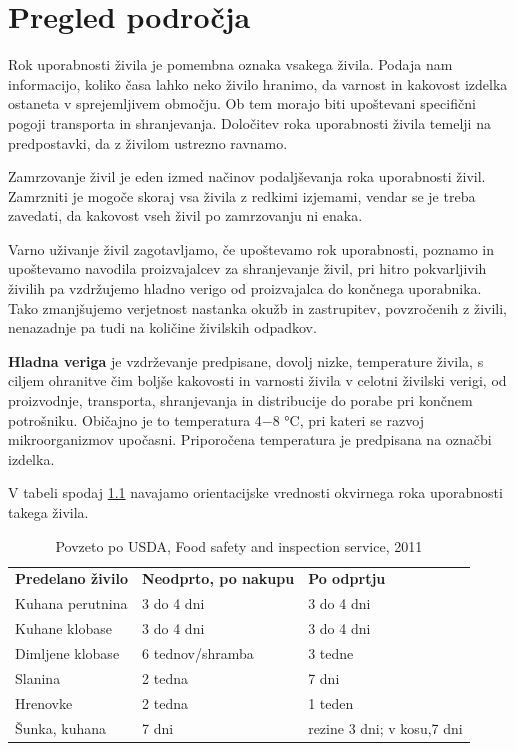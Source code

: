 \documentclass[a4paper, 12pt]{book}
\begin{document}
\chapter{Pregled področja}
\label{pregled-podrocja}
Rok uporabnosti živila je pomembna oznaka vsakega živila. Podaja nam informacijo, koliko časa lahko neko živilo hranimo, da varnost in kakovost izdelka ostaneta v sprejemljivem območju. Ob tem morajo biti upoštevani specifični pogoji transporta in shranjevanja. Določitev roka uporabnosti živila temelji na predpostavki, da z živilom ustrezno ravnamo.

Zamrzovanje živil je eden izmed načinov podaljševanja roka uporabnosti živil. Zamrzniti je mogoče skoraj vsa živila z redkimi izjemami, vendar se je treba zavedati, da kakovost vseh živil po zamrzovanju ni enaka.

Varno uživanje živil zagotavljamo, če upoštevamo rok uporabnosti, poznamo in upoštevamo navodila proizvajalcev za shranjevanje živil, pri hitro pokvarljivih živilih pa vzdržujemo hladno verigo od proizvajalca do končnega uporabnika. Tako zmanjšujemo verjetnost nastanka okužb in zastrupitev, povzročenih z živili, nenazadnje pa tudi na količine živilskih odpadkov.

\textbf{Hladna veriga} je vzdrževanje predpisane, dovolj nizke, temperature živila, s ciljem ohranitve čim boljše kakovosti in varnosti živila v celotni živilski verigi, od proizvodnje, transporta, 
shranjevanja in distribucije do porabe pri končnem potrošniku. 
Običajno je to temperatura 4−8 °C, pri kateri se razvoj mikroorganizmov upočasni. Priporočena temperatura je predpisana na označbi izdelka. \cite{nijz-brosura-varnost}

V tabeli spodaj \ref{tab:food-safety-table} navajamo orientacijske vrednosti okvirnega roka uporabnosti takega živila.

\begin{table}[h]
\begin{tabular}{lll}
\textbf{Predelano živilo} & \textbf{Neodprto, po nakupu} & \textbf{Po odprtju}        \\
Kuhana perutnina          & 3 do 4 dni                   & 3 do 4 dni                 \\
Kuhane klobase            & 3 do 4 dni                   & 3 do 4 dni                 \\
Dimljene klobase          & 6 tednov/shramba             & 3 tedne                    \\
Slanina                   & 2 tedna                      & 7 dni                      \\
Hrenovke                  & 2 tedna                      & 1 teden                    \\
Šunka, kuhana             & 7 dni                        & rezine 3 dni; v kosu,7 dni
\end{tabular}
\caption{ Povzeto po USDA, Food safety and inspection service, 2011 }
\label{tab:food-safety-table}
\end{table}
\end{document}
